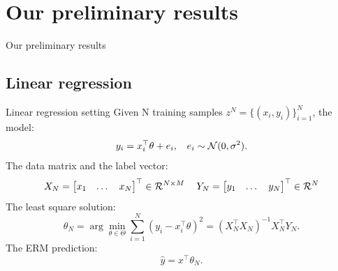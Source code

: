 \documentclass[aspectratio=169]{beamer}
\begin{document}
\section{Our preliminary results}
\begin{frame}[c]
\begin{center}
\Huge Our preliminary results
\end{center}
\end{frame}



\subsection{Linear regression}
\begin{frame}{Linear regression setting}
    Given N training samples $z^N=\{(x_i,y_i)\}_{i=1}^N$, the model:
    \begin{equation}
        y_i =x_i^\top \theta + e_i, \;\; \ e_i \sim \mathcal{N}(0,\sigma^2). 
    \vspace{5mm}
    \end{equation}
    The data matrix and the label vector:
    \begin{equation*}
        X_N = \begin{bmatrix} x_1 & \dots & x_N  \end{bmatrix}^\top \in \mathcal{R}^{N \times M} 
        \;\;\ \ 
        Y_N = \begin{bmatrix} y_1 & \dots & y_N \end{bmatrix}^\top \in \mathcal{R}^{N}
    \vspace{5mm}
    \end{equation*}
    The least square solution:
    \begin{equation}
        \theta_N = \arg\min_{\theta\in\Theta} \sum_{i=1}^N \left(y_i - x_i^\top \theta \right)^2 = (X_N^\top X_N)^{-1}X_N^\top Y_N.
    \end{equation}
    The ERM prediction:
    \begin{equation*}
        \hat{y} = x^\top \theta_{N}.
    \end{equation*}{}
    
\end{frame}
\end{document}
